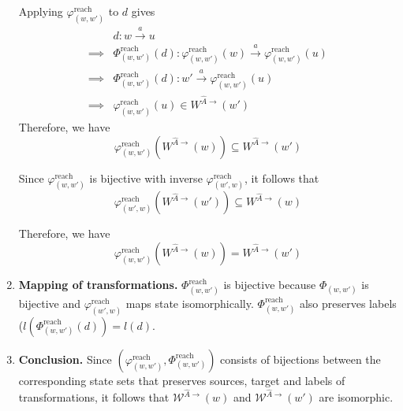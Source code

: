\begin{proofE}
\begin{enumerate}[(1)]
    Applying $\varphi_{(w,w')}^{\text{reach}}$ to $d$ gives
    \begin{align}
        & d: w \xrightarrow{a} u \\
        \implies & \Phi_{(w,w')}^{\text{reach}}(d): \varphi_{(w,w')}^{\text{reach}}(w) \xrightarrow{a} \varphi_{(w,w')}^{\text{reach}}(u) \\
        \implies & \Phi_{(w,w')}^{\text{reach}}(d): w' \xrightarrow{a} \varphi_{(w,w')}^{\text{reach}}(u) \\
        \implies & \varphi_{(w,w')}^{\text{reach}}(u) \in W^{\hat{A}\to}(w')
    \end{align}
    Therefore, we have
    \begin{equation}
        \varphi_{(w,w')}^{\text{reach}}(W^{\hat{A}\to}(w)) \subseteq W^{\hat{A}\to}(w')
    \end{equation}

    Since $\varphi_{(w,w')}^{\text{reach}}$ is bijective with inverse $\varphi_{(w',w)}^{\text{reach}}$, it follows that
    \begin{equation}
        \varphi_{(w',w)}^{\text{reach}}(W^{\hat{A}\to}(w')) \subseteq W^{\hat{A}\to}(w)
    \end{equation}

    Therefore, we have
    \begin{equation}
        \varphi_{(w,w')}^{\text{reach}}(W^{\hat{A}\to}(w)) = W^{\hat{A}\to}(w')
    \end{equation}

    \item \textbf{Mapping of transformations.}
    $\Phi_{(w,w')}^{\text{reach}}$ is bijective because $\Phi_{(w,w')}$ is bijective and $\varphi_{(w',w)}^{\text{reach}}$ maps state isomorphically. 
    $\Phi_{(w,w')}^{\text{reach}}$ also preserves labels ($l(\Phi_{(w,w')}^{\text{reach}}(d)) = l(d)$.
    
    \item \textbf{Conclusion.}
    Since $(\varphi_{(w,w')}^{\text{reach}}, \Phi_{(w,w')}^{\text{reach}})$ consists of bijections between the corresponding state sets that preserves sources, target and labels of transformations, it follows that $\mathscr{W}^{\hat{A}\to}(w)$ and $\mathscr{W}^{\hat{A}\to}(w')$ are isomorphic.
\end{enumerate}
\end{proofE}


\paragraph{
}

